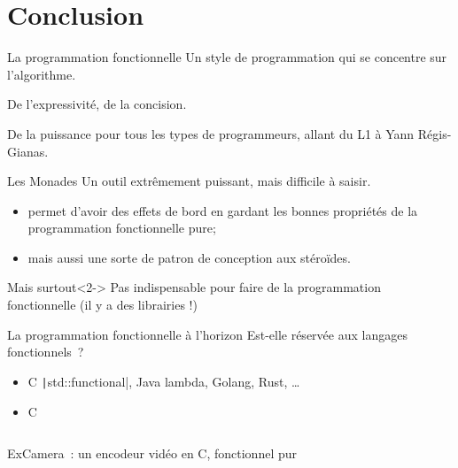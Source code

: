 \documentclass[10pt]{beamer}
\newcommand\CXX{C\nolinebreak[4]\hspace{-.05em}\raisebox{.4ex}{\relsize{-3}{\textbf{++}}}}
\begin{document}
\section{Conclusion}

\begin{frame}{La programmation fonctionnelle}
  Un style de programmation qui se concentre sur l'algorithme.

  De l'expressivité, de la concision.

  De la puissance pour tous les types de programmeurs, allant du L1 à
  Yann Régis-Gianas.
\end{frame}

\begin{frame}{Les Monades}
  Un outil extrêmement puissant, mais difficile à saisir.

  \begin{itemize}
  \item permet d'avoir des effets de bord en gardant les bonnes
    propriétés de la programmation fonctionnelle pure;
  \item mais aussi une sorte de patron de conception aux stéroïdes.
  \end{itemize}
  \begin{alertblock}{Mais surtout}<2->
      Pas indispensable pour faire de la
      programmation fonctionnelle (il y a des librairies !)
  \end{alertblock}
\end{frame}

\begin{frame}{La programmation fonctionnelle à l'horizon}
  Est-elle réservée aux langages fonctionnels~?
  \begin{itemize}
  \item \CXX{} \texttt|std::functional|, Java lambda, Golang, Rust, …
  \item C \inputminted{c}{./attributes.c}
  \end{itemize}

  ExCamera~\cite{fouladi2017encoding}: un encodeur vidéo en \CXX{},
  fonctionnel pur
\end{frame}

\begin{frame}[allowframebreaks]
  \nocite{*}
  \printbibliography{}
\end{frame}
\end{document}

